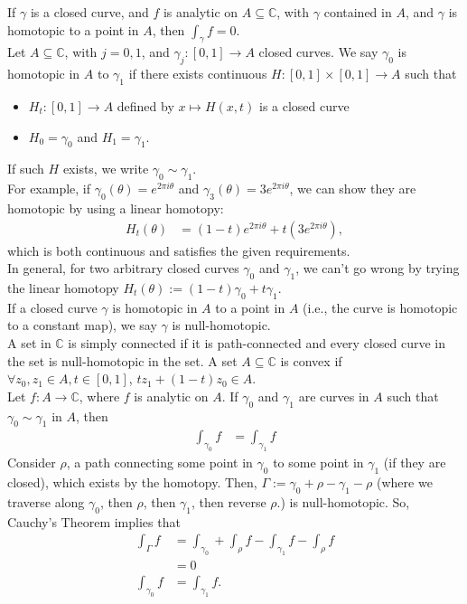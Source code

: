 \documentclass[10pt]{extarticle}
\newcommand{\C}{\mathbb{C}}
\begin{document}
  If $\gamma$ is a closed curve, and $f$ is analytic on $A\subseteq \C$, with $\gamma$ contained in $A$, and $\gamma$ is homotopic to a point in $A$, then $\int_{\gamma}f = 0$.\\

  Let $A\subseteq \C$, with $j = 0,1$, and $\gamma_j: [0,1]\rightarrow A$ closed curves. We say $\gamma_0$ is homotopic in $A$ to $\gamma_1$ if there exists continuous $H: [0,1]\times [0,1]\rightarrow A$ such that
  \begin{itemize}
    \item $H_{t}: [0,1]\rightarrow A$ defined by $x\mapsto H(x,t)$ is a closed curve
    \item $H_0 = \gamma_0$ and $H_1 = \gamma_1$.
  \end{itemize}
  If such $H$ exists, we write $\gamma_0 \sim \gamma_1$.\\

  For example, if $\gamma_0(\theta) = e^{2\pi i \theta}$ and $\gamma_3(\theta) = 3e^{2\pi i \theta}$, we can show they are homotopic by using a linear homotopy:
  \begin{align*}
    H_t(\theta) &= (1-t)e^{2\pi i \theta} + t\left(3e^{2\pi i \theta}\right),
  \end{align*}
  which is both continuous and satisfies the given requirements.\\

  In general, for two arbitrary closed curves $\gamma_0$ and $\gamma_1$, we can't go wrong by trying the linear homotopy $H_t(\theta) := (1-t)\gamma_0 + t\gamma_1$.\\

  If a closed curve $\gamma$ is homotopic in $A$ to a point in $A$ (i.e., the curve is homotopic to a constant map), we say $\gamma$ is null-homotopic.\\

  A set in $\C$ is simply connected if it is path-connected and every closed curve in the set is null-homotopic in the set. A set $A\subseteq \C$ is convex if $\forall z_0,z_1\in A, t\in [0,1]$, $tz_1 + (1-t)z_0 \in A$.\\

  Let $f: A\rightarrow \C$, where $f$ is analytic on $A$. If $\gamma_0$ and $\gamma_1$ are curves in $A$ such that $\gamma_0 \sim \gamma_1$ in $A$, then
  \begin{align*}
    \int_{\gamma_0}f &= \int_{\gamma_1} f
  \end{align*}
  Consider $\rho$, a path connecting some point in $\gamma_0$ to some point in $\gamma_1$ (if they are closed), which exists by the homotopy. Then, $\Gamma := \gamma_0 + \rho - \gamma_1 - \rho$ (where we traverse along $\gamma_0$, then $\rho$, then $\gamma_1$, then reverse $\rho$.) is null-homotopic. So, Cauchy's Theorem implies that
  \begin{align*}
    \int_{\Gamma}f &= \int_{\gamma_0} + \int_{\rho} f - \int_{\gamma_1}f -\int_{\rho} f\\
                   &= 0\\
    \int_{\gamma_0} f &= \int_{\gamma_1}f .
  \end{align*}
\end{document}
